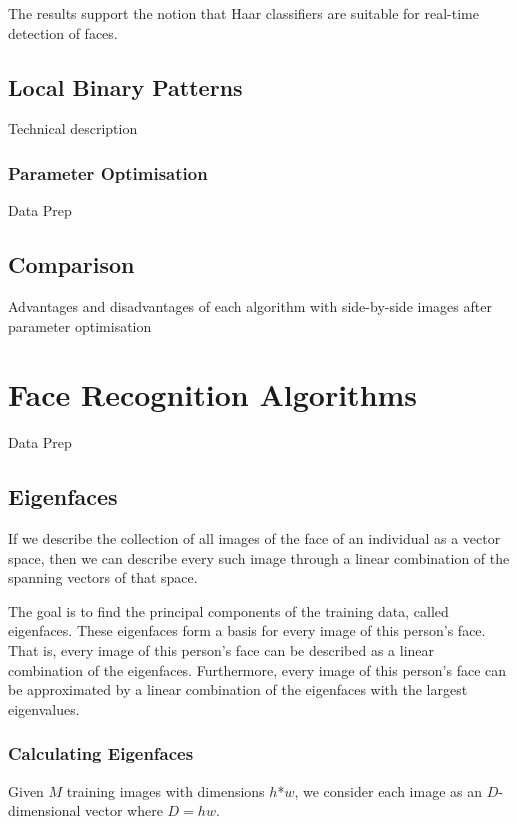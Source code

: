 \documentclass{article}
\begin{document}
The results support the notion that Haar classifiers are suitable for real-time detection of faces.


\subsection{Local Binary Patterns}
Technical description
\subsubsection{Parameter Optimisation}
Data Prep

\subsection{Comparison}
Advantages and disadvantages of each algorithm with side-by-side images after parameter optimisation


\section{Face Recognition Algorithms}
Data Prep

\subsection{Eigenfaces}
If we describe the collection of all images of the face of an individual as a vector space, then we can describe every such image through a linear combination of the spanning vectors of that space.

The goal is to find the principal components of the training data, called eigenfaces. These eigenfaces form a basis for every image of this person’s face. That is, every image of this person’s face can be described as a linear combination of the eigenfaces. Furthermore, every image of this person’s face can be approximated by a linear combination of the eigenfaces with the largest eigenvalues.

\subsubsection{Calculating Eigenfaces}
Given $M$ training images with dimensions $h$*$w$, we consider each image as an $D$-dimensional vector where $D = hw$.
\end{document}
